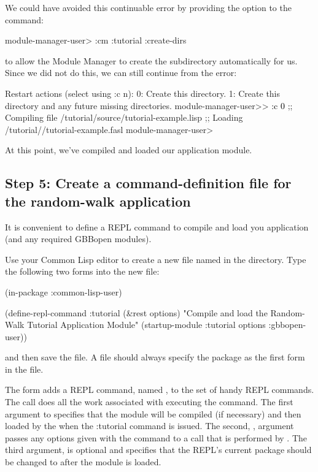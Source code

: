 \documentclass[10pt,twoside,english,pdftex]{article}
\begin{document}
We could have avoided this continuable error by providing the
 option to the  command:
%
\W\supp
\begin{example}
\textcolor{darkergray}{%
  module-manager-user> :cm :tutorial :create-dirs}
\end{example}
%
to allow the Module Manager to create the 
subdirectory automatically for us.  Since we did not do this, we can still
continue from the error:
%
\W\supp\notpretop
\begin{example}
\textcolor{darkergray}{%
  Restart actions (select using :c n):
    0: Create this directory.
    1: Create this directory and any future missing directories.
  module-manager-user>> \textcolor{black}{:c 0}
  ;; Compiling file /tutorial/source/tutorial-example.lisp
  ;; Loading /tutorial//tutorial-example.fasl
  module-manager-user>}
\end{example}

At this point, we've compiled and loaded our  application
module.

\subsection*{Step 5: Create a command-definition file for the random-walk
  application}

It is convenient to define a REPL command to compile and load you application
(and any required GBBopen modules).  

Use your Common Lisp editor to create a new file named
 in the  directory. Type the
following two forms into the new  file:
%
%
%
\W\supp
\begin{example}
  (in-package :common-lisp-user)

  (define-repl-command :tutorial (\&rest options)
    "Compile and load the Random-Walk Tutorial Application Module"
    (startup-module :tutorial options :gbbopen-user))
\end{example}
%
and then save the file.  A  file should always
specify the  package as the first form in the
file.

The  form adds a REPL command, named
, to the set of handy REPL commands.  The
 call does all the work associated with
executing the command.  The first argument to 
specifies that the  module will be compiled (if necessary) and
then loaded by the  when the
\code:{tutorial} command is issued.  The second, , argument
passes any options given with the command to a 
call that is performed by .  The third argument,
 is optional and specifies that the REPL's current
package should be changed to  after the
 module is loaded.
\end{document}
